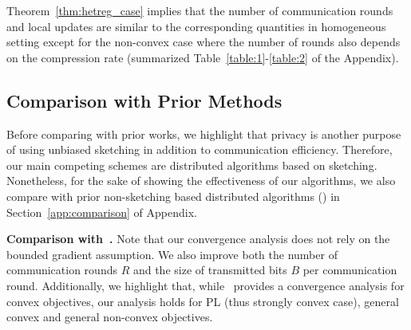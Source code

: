 \documentclass[11pt]{article}
\begin{document}

Theorem~\ref{thm:hetreg_case} implies that the number of communication rounds and local updates are similar to the corresponding quantities in homogeneous setting except for the non-convex case where the number of  rounds also depends on the compression rate (summarized Table~\ref{table:1}-\ref{table:2} of the Appendix).


\vspace{-0.05in}
\subsection{Comparison with Prior Methods} 

Before comparing with prior works, we highlight that privacy is another purpose of using unbiased sketching in addition to communication efficiency. 
Therefore, our main competing schemes are distributed algorithms based on sketching. 
Nonetheless, for the sake of showing the effectiveness of our algorithms, we also compare with prior non-sketching based distributed algorithms (\cite{karimireddy2019scaffold,basu2019qsparse,reisizadeh2020fedpaq,haddadpour2020federated}) in Section~\ref{app:comparison} of Appendix.


\noindent\textbf{Comparison with~\cite{li2019privacy}.} Note that our convergence analysis does not rely on the bounded gradient assumption. We also improve both the number of communication rounds $R$ and the size of transmitted bits $B$ per communication round. 
Additionally, we highlight that, while~\citep{li2019privacy} provides a convergence analysis for convex objectives, our analysis holds for PL (thus strongly convex case), general convex and general non-convex objectives.
\end{document}
